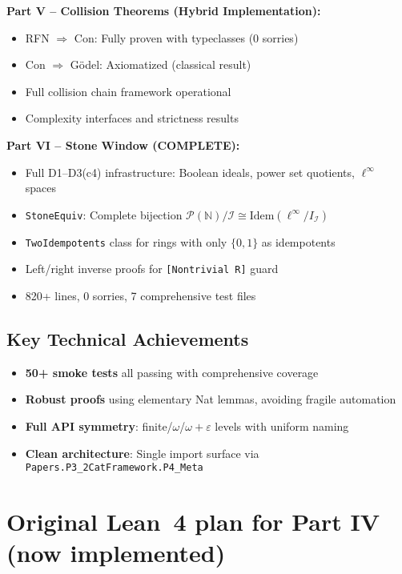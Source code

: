 \documentclass[11pt]{article}
\theoremstyle{definition}
\theoremstyle{remark}
\begin{document}
\textbf{Part V -- Collision Theorems (Hybrid Implementation):}
\begin{itemize}
\item RFN $\Rightarrow$ Con: Fully proven with typeclasses (0 sorries)
\item Con $\Rightarrow$ G\"odel: Axiomatized (classical result)
\item Full collision chain framework operational
\item Complexity interfaces and strictness results
\end{itemize}

\textbf{Part VI -- Stone Window (COMPLETE):}
\begin{itemize}
\item Full D1--D3(c4) infrastructure: Boolean ideals, power set quotients, $\ell^\infty$ spaces
\item \texttt{StoneEquiv}: Complete bijection $\mathcal{P}(\mathbb{N})/\mathcal{I} \cong \text{Idem}(\ell^\infty/I_{\mathcal{I}})$
\item \texttt{TwoIdempotents} class for rings with only $\{0,1\}$ as idempotents
\item Left/right inverse proofs for \texttt{[Nontrivial R]} guard
\item 820+ lines, 0 sorries, 7 comprehensive test files
\end{itemize}

\subsection*{Key Technical Achievements}
\begin{itemize}
\item \textbf{50+ smoke tests} all passing with comprehensive coverage
\item \textbf{Robust proofs} using elementary Nat lemmas, avoiding fragile automation
\item \textbf{Full API symmetry}: finite/$\omega$/$\omega+\varepsilon$ levels with uniform naming
\item \textbf{Clean architecture}: Single import surface via \texttt{Papers.P3\_2CatFramework.P4\_Meta}
\end{itemize}

\section{Original Lean~4 plan for Part IV (now implemented)}
\end{document}
